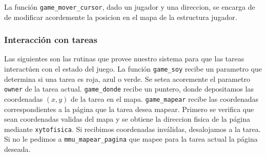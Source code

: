 La función \verb|game_mover_cursor|, dado un jugador y una direccion, se encarga de de modificar acordemente la posicion en el mapa de la estructura jugador.

\subsubsection{Interacción con tareas}

Las siguientes son las rutinas que provee nuestro sistema para que las tareas interactúen con el estado del juego.
La función \verb|game_soy| recibe un parametro que determina si una tarea es roja, azul o verde. Se setea acoremente el parametro \verb|owner| de la tarea actual.
\verb|game_donde| recibe un puntero, donde depositamos las coordenadas $(x,y)$ de la tarea en el mapa.
\verb|game_mapear| recibe las coordenadas correspondientes a la página que la tarea desea mapear. Primero se verifica que sean coordenadas validas del mapa y se obtiene la direccion fisica de la página mediante \verb|xytofisica|. Si recibimos coordenadas inválidas, desalojamos a la tarea. Si no le pedimos a \verb|mmu_mapear_pagina| que mapee para la tarea actual la página deseada. \\


